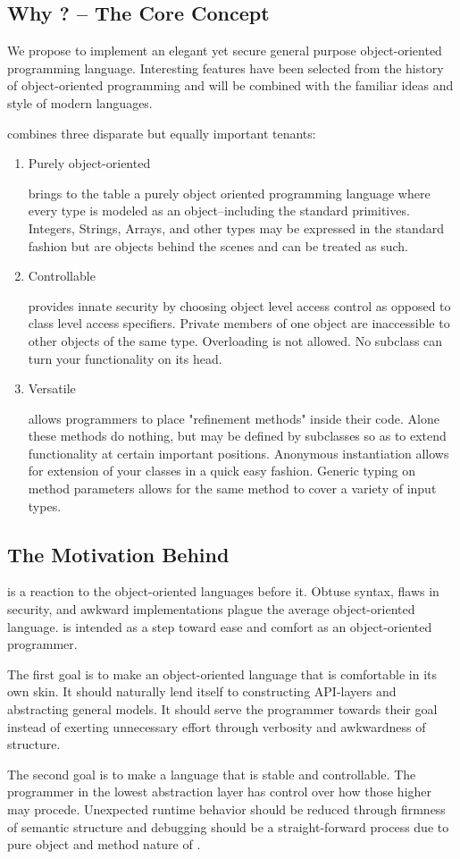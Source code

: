 \subsection*{Why \Lang{}? -- The Core Concept}
We propose to implement an elegant yet secure general purpose object-oriented programming language. Interesting features have been selected from the history of object-oriented programming and will be combined with the familiar ideas and style of modern languages.

\Lang{} combines three disparate but equally important tenants:


\begin{enumerate}
\item{Purely object-oriented 
    
    \Lang{} brings to the table a purely object oriented programming language where every type is
    modeled as an object--including the standard primitives. Integers, Strings, Arrays, and other types may be expressed in the standard fashion but are objects behind the scenes and can be treated as such.}

\item{Controllable

   \Lang{} provides innate security by choosing object level access
   control as opposed to class level access specifiers. Private members of one object
   are inaccessible to other objects of the same type. Overloading is not allowed.
   No subclass can turn your functionality on its head.}

\item{Versatile

    \Lang{} allows programmers to place "refinement methods" inside their code.
    Alone these methods do nothing, but may be defined by subclasses so as to extend
    functionality at certain important positions. Anonymous instantiation allows for
    extension of your classes in a quick easy fashion. Generic typing on method
    parameters allows for the same method to cover a variety of input types.}
\end{enumerate}

\subsection*{ The Motivation Behind \Lang{}}
\Lang{} is a reaction to the object-oriented languages before it.
Obtuse syntax, flaws in security, and awkward implementations plague
the average object-oriented language. \Lang{} is intended as a step
toward ease and comfort as an object-oriented programmer.


The first goal is to make an object-oriented language that is comfortable
in its own skin. It should naturally lend itself to constructing API-layers
and abstracting general models. It should serve the programmer towards their
goal instead of exerting unnecessary effort through verbosity and awkwardness
of structure.


The second goal is to make a language that is stable and controllable.
The programmer in the lowest abstraction layer has control over how those
higher may procede. Unexpected runtime behavior should be reduced through
firmness of semantic structure and debugging should be a straight-forward
process due to pure object and method nature of \Lang{}.
